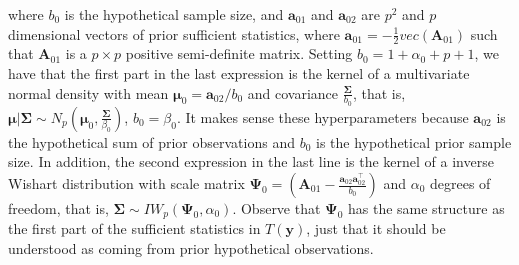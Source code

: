 \begin{enumerate}
where $b_0$ is the hypothetical sample size, and $\mathbf{a}_{01}$ and $\mathbf{a}_{02}$ are $p^2$ and $p$ dimensional vectors of prior sufficient statistics, where $\mathbf{a}_{01}=-\frac{1}{2}vec(\mathbf{A}_{01})$ such that $\mathbf{A}_{01}$ is a $p\times p$ positive semi-definite matrix. Setting $b_0=1+\alpha_0+p+1$, we have that the first part in the last expression is the kernel of a multivariate normal density with mean $\mathbf{\mu}_0=\mathbf{a}_{02}/b_0$ and covariance $\frac{\mathbf{\Sigma}}{b_0}$, that is, $\mathbf{\mu}|\mathbf{\Sigma}\sim N_p\left(\mathbf{\mu}_0,\frac{\mathbf{\Sigma}}{\beta_0}\right)$, $b_0=\beta_0$. It makes sense these hyperparameters because $\mathbf{a}_{02}$ is the hypothetical sum of prior observations and $b_0$ is the hypothetical prior sample size. In addition, the second expression in the last line is the kernel of a inverse Wishart distribution with scale matrix $\mathbf{\Psi}_0=\left(\mathbf{A}_{01}-\frac{\mathbf{a}_{02}\mathbf{a}_{02}^{\top}}{b_0}\right)$ and $\alpha_0$ degrees of freedom, that is, $\mathbf{\Sigma}\sim IW_p(\mathbf{\Psi}_0,\alpha_0)$. Observe that $\mathbf{\Psi}_0$ has the same structure as the first part of the sufficient statistics in $T(\mathbf{y})$, just that it should be understood as coming from prior hypothetical observations.


\end{enumerate}
